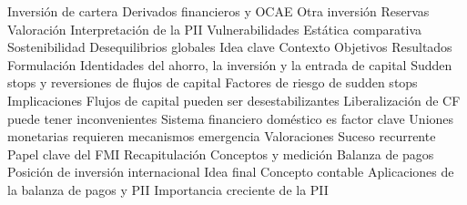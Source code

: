 \documentclass{nuevotema}
\begin{document}
\begin{esquema}[enumerate]
			\3 Inversión de cartera
			\3 Derivados financieros y OCAE
			\3 Otra inversión
			\3 Reservas
			\3 Valoración
		\2 Interpretación de la PII
			\3 Vulnerabilidades
			\3 Estática comparativa
			\3 Sostenibilidad
			\3 Desequilibrios globales
	\1 
		\2 Idea clave
			\3 Contexto
			\3 Objetivos
			\3 Resultados
		\2 Formulación
			\3 Identidades del ahorro, la inversión y la entrada de capital
			\3 Sudden stops y reversiones de flujos de capital
			\3 Factores de riesgo de sudden stops
		\2 Implicaciones
			\3 Flujos de capital pueden ser desestabilizantes
			\3 Liberalización de CF puede tener inconvenientes
			\3 Sistema financiero doméstico es factor clave
			\3 Uniones monetarias requieren mecanismos emergencia
		\2 Valoraciones
			\3 Suceso recurrente
			\3 Papel clave del FMI
	\1 
		\2 Recapitulación
			\3 Conceptos y medición
			\3 Balanza de pagos
			\3 Posición de inversión internacional
		\2 Idea final
			\3 Concepto contable
			\3 Aplicaciones de la balanza de pagos y PII
			\3 Importancia creciente de la PII

\end{esquema}

\esquemalargo
\end{document}
